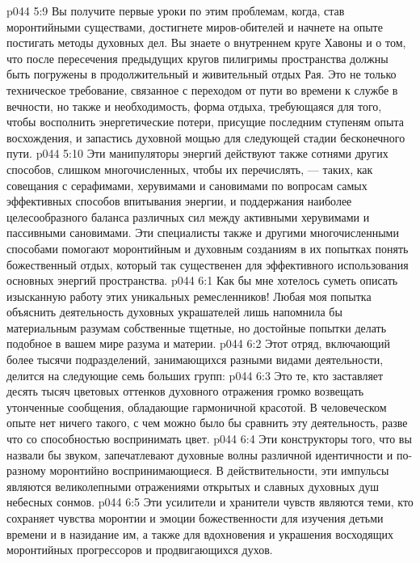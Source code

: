 \vs p044 5:9 Вы получите первые уроки по этим проблемам, когда, став моронтийными существами, достигнете миров\hyp{}обителей и начнете на опыте постигать методы духовных дел. Вы знаете о внутреннем круге Хавоны и о том, что после пересечения предыдущих кругов пилигримы пространства должны быть погружены в продолжительный и живительный отдых Рая. Это не только техническое требование, связанное с переходом от пути во времени к службе в вечности, но также и необходимость, форма отдыха, требующаяся для того, чтобы восполнить энергетические потери, присущие последним ступеням опыта восхождения, и запастись духовной мощью для следующей стадии бесконечного пути.
\vs p044 5:10 Эти манипуляторы энергий действуют также сотнями других способов, слишком многочисленных, чтобы их перечислять, --- таких, как совещания с серафимами, херувимами и сановимами по вопросам самых эффективных способов впитывания энергии, и поддержания наиболее целесообразного баланса различных сил между активными херувимами и пассивными сановимами. Эти специалисты также и другими многочисленными способами помогают моронтийным и духовным созданиям в их попытках понять божественный отдых, который так существенен для эффективного использования основных энергий пространства.
\vs p044 6:1 Как бы мне хотелось суметь описать изысканную работу этих уникальных ремесленников! Любая моя попытка объяснить деятельность духовных украшателей лишь напомнила бы материальным разумам собственные тщетные, но достойные попытки делать подобное в вашем мире разума и материи.
\vs p044 6:2 Этот отряд, включающий более тысячи подразделений, занимающихся разными видами деятельности, делится на следующие семь больших групп:
\vs p044 6:3 \bibnobreakspace {} Это те, кто заставляет десять тысяч цветовых оттенков духовного отражения громко возвещать утонченные сообщения, обладающие гармоничной красотой. В человеческом опыте нет ничего такого, с чем можно было бы сравнить эту деятельность, разве что со способностью воспринимать цвет.
\vs p044 6:4 \pc {}\bibnobreakspace {} Эти конструкторы того, что вы назвали бы звуком, запечатлевают духовные волны различной идентичности и по\hyp{}разному моронтийно воспринимающиеся. В действительности, эти импульсы являются великолепными отражениями открытых и славных духовных душ небесных сонмов.
\vs p044 6:5 \pc {}\bibnobreakspace {} Эти усилители и хранители чувств являются теми, кто сохраняет чувства моронтии и эмоции божественности для изучения детьми времени и в назидание им, а также для вдохновения и украшения восходящих моронтийных прогрессоров и продвигающихся духов.
